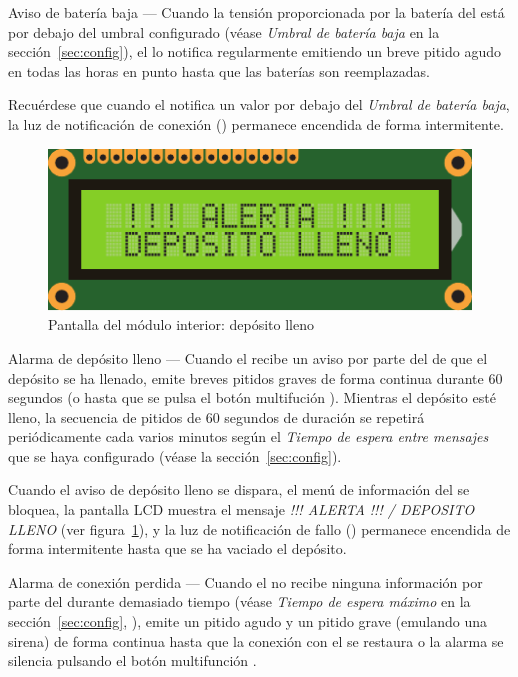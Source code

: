 \begin{descriptioncompact}

\item[Aviso de batería baja] --- Cuando la tensión proporcionada por la batería del \MEE está por debajo del umbral configurado (véase \emph{Umbral de batería baja} en la sección~\ref{sec:config}), el \MIE lo notifica regularmente emitiendo un breve pitido agudo en todas las horas en punto hasta que las baterías son reemplazadas.

Recuérdese que cuando el \ME notifica un valor por debajo del \emph{Umbral de batería baja}, la luz de notificación de conexión  () permanece encendida de forma intermitente.

\begin{figure}[!b]
  \centering
  \includegraphics[width=0.6\columnwidth]{images/screen-deposit-full}
  \caption{Pantalla del módulo interior: depósito lleno}
  \label{fig:screen-deposit-full}
\end{figure}

\item[Alarma de depósito lleno] --- Cuando el \MIE recibe un aviso por parte del \MEE de que el depósito se ha llenado, emite breves pitidos graves de forma continua durante 60 segundos (o hasta que se pulsa el botón multifución ).
Mientras el depósito esté lleno, la secuencia de pitidos de 60 segundos de duración se repetirá periódicamente cada varios minutos según el \emph{Tiempo de espera entre mensajes} que se haya configurado (véase la sección~\ref{sec:config}). 

Cuando el aviso de depósito lleno se dispara, el menú de información del \MIE se bloquea, la pantalla LCD  muestra el mensaje \emph{!!! ALERTA !!! / DEPO\-SITO LLENO} (ver figura~\ref{fig:screen-deposit-full}), y la luz de notificación de fallo  () permanece encendida de forma intermitente hasta que se ha vaciado el depósito. 


\item[Alarma de conexión perdida] --- Cuando el \MIE no recibe ninguna información por parte del \MEE durante demasiado tiempo (véase \emph{Tiempo de espera máximo} en la sección~\ref{sec:config}, ), emite un pitido agudo y un pitido grave (emulando una sirena) de forma continua hasta que la conexión con el \MEE se restaura o la alarma se silencia pulsando el botón multifunción .   


\end{descriptioncompact}
